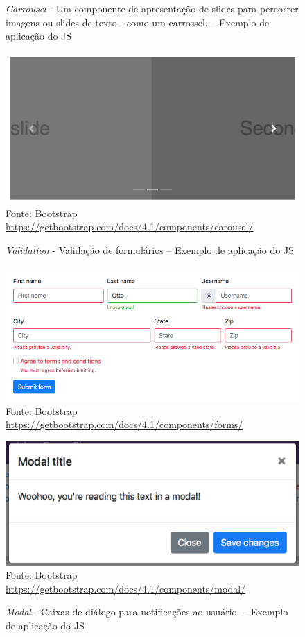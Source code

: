 \documentclass[
	12pt,				%
	openright,			%
	twoside,			%
	a4paper,			%
	english,			%
	brazil				%
	]{abntex2}
\begin{document}
\begin{figure}[h]
	\centering

	\caption{\textit{Carrousel} - Um componente de apresentação de slides para percorrer imagens ou slides de texto - como um carrossel. -- Exemplo de aplicação do JS} \label{fig:JSExampleCarrousel}
    \includegraphics[scale=0.4]{js-example-carrousel} \\
    Fonte: {Bootstrap \url{https://getbootstrap.com/docs/4.1/components/carousel/}}

    \caption{\textit{Validation} - Validação de formulários -- Exemplo de aplicação do JS} \label{fig:JSExampleValidation}
    \includegraphics[scale=0.45]{js-example-validation} \\
    Fonte: {Bootstrap \url{https://getbootstrap.com/docs/4.1/components/forms/}}
	
    \caption{\textit{Modal} - Caixas de diálogo para notificações ao usuário. -- Exemplo de aplicação do JS} \label{fig:JSExampleModal}
    \includegraphics[scale=0.5]{js-example-modal} \\
    Fonte: {Bootstrap \url{https://getbootstrap.com/docs/4.1/components/modal/}}

\end{figure}
\end{document}
